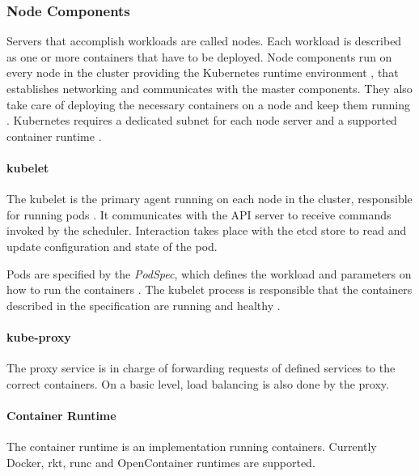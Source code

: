 \subsubsection{Node Components}\label{node-components}

Servers that accomplish workloads are called nodes. Each workload is
described as one or more containers that have to be deployed. Node
components run on every node in the cluster providing the Kubernetes
runtime environment \cite{kub_comp}, that establishes networking and
communicates with the master components. They also take care of
deploying the necessary containers on a node and keep them running
\cite{kub_intro}. Kubernetes requires a dedicated subnet for each node
server and a supported container runtime \cite{kub_comp}.

\paragraph{kubelet}\label{kubelet}

The kubelet is the primary agent running on each node in the cluster,
responsible for running pods \cite{kub_comp}. It communicates with the
API server to receive commands invoked by the scheduler. Interaction
takes place with the etcd store to read and update configuration and
state of the pod.

Pods are specified by the \emph{PodSpec}, which defines the workload and
parameters on how to run the containers \cite{kub_intro}. The kubelet
process is responsible that the containers described in the
specification are running and healthy \cite{kub_comp}.

\paragraph{kube-proxy}\label{kube-proxy}

The proxy service is in charge of forwarding requests of defined
services to the correct containers. On a basic level, load balancing is
also done by the proxy. \cite{baier-kub}

\paragraph{Container Runtime}\label{container-runtime}

The container runtime is an implementation running containers. Currently
Docker, rkt, runc and OpenContainer runtimes are supported.
\cite{kub_comp}

